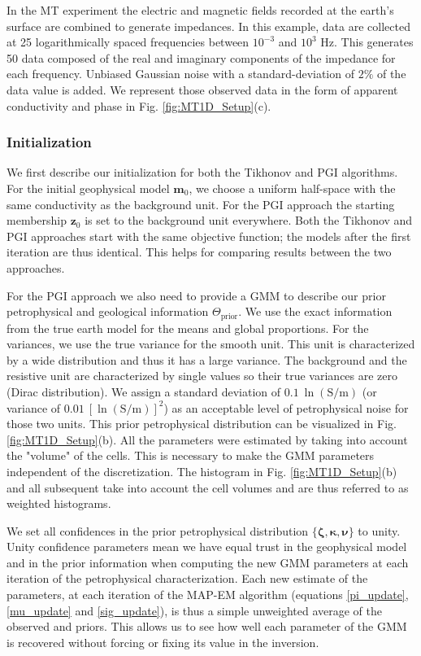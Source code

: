 \documentclass[extra]{gji} %
\begin{document}
In the MT experiment the electric and magnetic fields recorded at the earth’s surface are combined to generate impedances. In this example, data are collected at 25 logarithmically spaced frequencies between $10^{-3}$ and $10^3$ Hz. This generates 50 data composed of the real and imaginary components of the impedance for each frequency. Unbiased Gaussian noise with a standard-deviation of $2\%$ of the data value is added. We represent those observed data in the form of apparent conductivity and phase in Fig. \ref{fig:MT1D_Setup}(c).


\subsubsection{Initialization}

We first describe our initialization for both the Tikhonov and PGI algorithms. For the initial geophysical model $\mathbf{m}_0$, we choose a uniform half-space with the same conductivity as the background unit. For the PGI approach the starting membership $\mathbf{z}_0$ is set to the background unit everywhere. Both the Tikhonov and PGI approaches start with the same objective function; the models after the first iteration are thus identical. This helps for comparing results between the two approaches.

For the PGI approach we also need to provide a GMM to describe our prior petrophysical and geological information $\Theta_{\text{prior}}$. We use the exact information from the true earth model for the means and global proportions. For the variances, we use the true variance for the smooth unit. This unit is characterized by a wide distribution and thus it has a large variance. The background and the resistive unit are characterized by single values so their true variances are zero (Dirac distribution). We assign a standard deviation of $0.1~\ln(\text{S/m})$ (or variance of $0.01~[\ln(\text{S/m})]^2$) as an acceptable level of petrophysical noise for those two units. This prior petrophysical distribution can be visualized in Fig. \ref{fig:MT1D_Setup}(b). All the parameters were estimated by taking into account the "volume" of the cells. This is necessary to make the GMM parameters independent of the discretization. The histogram in Fig. \ref{fig:MT1D_Setup}(b) and all subsequent take into account the cell volumes and are thus referred to as weighted histograms.

We set all confidences in the prior petrophysical distribution $\{\mathbf{\zeta},\mathbf{\kappa},\mathbf{\nu}\}$ to unity. Unity confidence parameters mean we have equal trust in the geophysical model and in the prior information when computing the new GMM parameters at each iteration of the petrophysical characterization. Each new estimate of the parameters, at each iteration of the MAP-EM algorithm (equations \ref{pi_update}, \ref{mu_update} and \ref{sig_update}), is thus a simple unweighted average of the observed and priors. This allows us to see how well each parameter of the GMM is recovered without forcing or fixing its value in the inversion.
\end{document}
